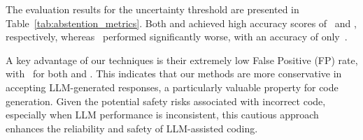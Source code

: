 








The evaluation results for the uncertainty threshold are presented in Table~\ref{tab:abstention_metrics}. 
Both \SESymbolic and \SESymbolicUnif achieved high accuracy scores of \SENormAcc~and \SEUnifAcc, respectively, whereas \LLMProbability~performed significantly worse, with an accuracy of only~\LLMProbabilityAcc.

A key advantage of our techniques is their extremely low False Positive (FP) rate, with \SENormFP~for both \SESymbolic and \SESymbolicUnif. 
This indicates that our methods are more conservative in accepting LLM-generated responses, a particularly valuable property for code generation. 
Given the potential safety risks associated with incorrect code, especially when LLM performance is inconsistent, this cautious approach enhances the reliability and safety of LLM-assisted coding.


